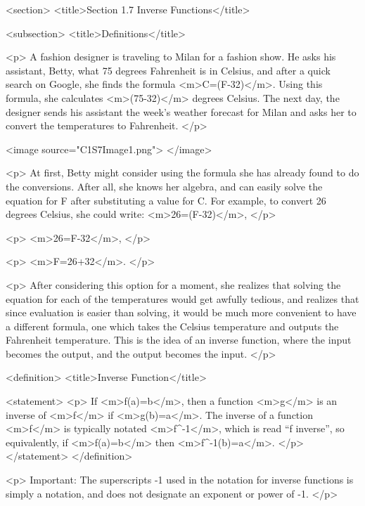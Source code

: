 <section>
    <title>Section 1.7 Inverse Functions</title>

    <subsection>
        <title>Definitions</title>

        <p>
            A fashion designer is traveling to Milan for a fashion show.
            He asks his assistant, Betty, what 75 degrees Fahrenheit is in Celsius, and after a quick search on Google, she finds the formula <m>C=(F-32)</m>.
            Using this formula, she calculates <m>(75-32)</m> degrees Celsius.
            The next day, the designer sends his assistant the week’s weather forecast for Milan and asks her to convert the temperatures to Fahrenheit.
        </p>

        <image source="C1S7Image1.png">
        </image>

        <p>
            At first, Betty might consider using the formula she has already found to do the conversions.
            After all, she knows her algebra, and can easily solve the equation for F after substituting a value for C.
            For example, to convert 26 degrees Celsius, she could write: <m>26=(F-32)</m>,
        </p>

        <p>
            <m>26\times {}=F-32</m>,
        </p>

        <p>
            <m>F=26\times{}+32</m>.
        </p>

        <p>
            After considering this option for a moment, she realizes that solving the equation for each of the temperatures would get awfully tedious, and realizes that since evaluation is easier than solving, it would be much more convenient to have a different formula, one which takes the Celsius temperature and outputs the Fahrenheit temperature.
            This is the idea of an inverse function, where the input becomes the output, and the output becomes the input.
        </p>

        <definition>
            <title>Inverse Function</title>

            <statement>
                <p>
                    If <m>f(a)=b</m>, then a function <m>g</m> is an inverse of <m>f</m> if <m>g(b)=a</m>.
                    The inverse of a function <m>f</m> is typically notated <m>f^{-1}</m>, which is read “f inverse”, so equivalently, if <m>f(a)=b</m> then <m>f^{-1}(b)=a</m>.
                </p>
            </statement>
        </definition>

        <p>
            Important: The superscripts -1 used in the notation for inverse functions is simply a notation, and does not designate an exponent or power of -1.
        </p>

